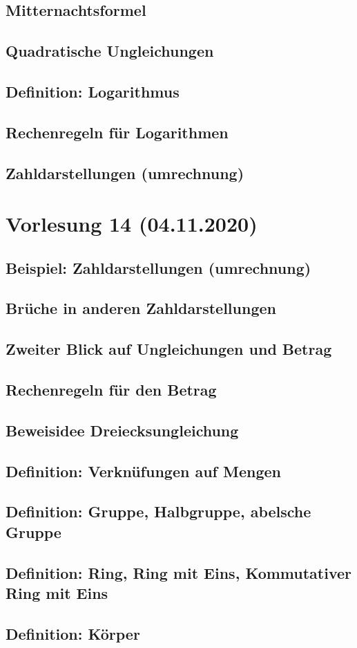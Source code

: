 \documentclass[]{article}
\begin{document}
\subsection{Mitternachtsformel}
\subsection{Quadratische Ungleichungen}
\subsection{Definition: Logarithmus}
\subsection{Rechenregeln für Logarithmen}
\subsection{Zahldarstellungen (umrechnung)}


\section{Vorlesung 14 (04.11.2020)}
\subsection{Beispiel: Zahldarstellungen (umrechnung)}
\subsection{Brüche in anderen Zahldarstellungen}
\subsection{Zweiter Blick auf Ungleichungen und Betrag}
\subsection{Rechenregeln für den Betrag}
\subsection{Beweisidee Dreiecksungleichung}
\subsection{Definition: Verknüfungen auf Mengen}
\subsection{Definition: Gruppe, Halbgruppe, abelsche Gruppe}
\subsection{Definition: Ring, Ring mit Eins, Kommutativer Ring mit Eins}
\subsection{Definition: Körper}

\end{document}
